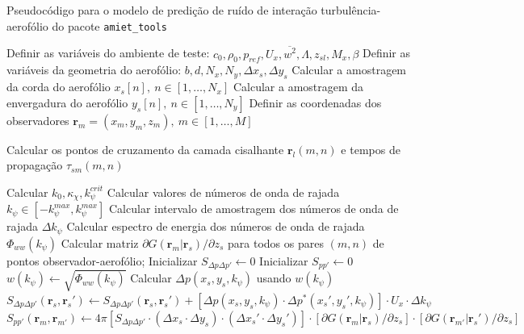 \documentclass[a4paper, 11pt, twoside]{article}
\begin{document}
\begin{algorithm}
	\caption{Pseudocódigo para o modelo de predição de ruído de interação turbulência-aerofólio do pacote \texttt{amiet\_tools}}
	\label{alg:amiet_pseudocode}
	\begin{algorithmic}[1] %
		\State Definir as variáveis do ambiente de teste: $c_0, \rho_0, p_{ref}, U_x, \overline{w^2}, \Lambda, z_{sl}, M_x, \beta$
		\State Definir as variáveis da geometria do aerofólio: $b, d, N_x, N_y, \Delta x_s, \Delta y_s$
		\State Calcular a amostragem da corda do aerofólio $x_s[n], \ n \in [1, \ldots, N_x]$
		\State Calcular a amostragem da envergadura do aerofólio $y_s[n], \ n \in [1, \ldots, N_y]$
		\State Definir as coordenadas dos observadores $\mathbf{r}_m = (x_m, y_m, z_m), \ m \in [1, \ldots, M]$
		
		\State Calcular os pontos de cruzamento da camada cisalhante $\mathbf{r}_l(m, n)$ e tempos de propagação $\tau_{sm}(m, n)$
		\EndFor
		\EndIf
		
		\State Calcular $k_0, \kappa_\chi, k_\psi^{crit}$
		\State Calcular valores de números de onda de rajada $k_\psi \in [-k_\psi^{max}, k_\psi^{max}]$
		\State Calcular intervalo de amostragem dos números de onda de rajada $\Delta k_\psi$
		\State Calcular espectro de energia dos números de onda de rajada $\Phi_{ww}(k_\psi)$
		\State Calcular matriz $\partial G(\mathbf{r}_m|\mathbf{r}_s)/\partial z_s$ para todos os pares $(m, n)$ de pontos observador-aerofólio; 
		\State Inicializar $S_{\Delta p \Delta p'} \gets 0$
		\State Inicializar $S_{p p'} \gets 0$
		\State $w(k_\psi) \gets \sqrt{\Phi_{ww}(k_\psi)}$
		\State Calcular $\Delta p(x_s, y_s, k_\psi)$ usando $w(k_\psi)$ 
		\State $S_{\Delta p \Delta p'}(\mathbf{r}_s, \mathbf{r}_s') \gets S_{\Delta p \Delta p'}(\mathbf{r}_s, \mathbf{r}_s') + \left[ \Delta p(x_s, y_s, k_\psi) \cdot \Delta p^*(x_s', y_s', k_\psi) \right] \cdot U_x \cdot \Delta k_\psi$ \label{alg:crossproduct}
		\EndFor
		\State $S_{pp'}(\mathbf{r}_m, \mathbf{r}_{m'}) \gets 4 \pi \left[ S_{\Delta p \Delta p'} \cdot (\Delta x_s \cdot \Delta y_s) \cdot (\Delta x_s' \cdot \Delta y_s') \right] \cdot \left[ \partial G(\mathbf{r}_m|\mathbf{r}_s)/\partial z_s \right] \cdot \left[ \partial G(\mathbf{r}_{m'}|\mathbf{r}_s')/\partial z_s \right]$
		\EndFor
	\end{algorithmic}
\end{algorithm}
\end{document}
